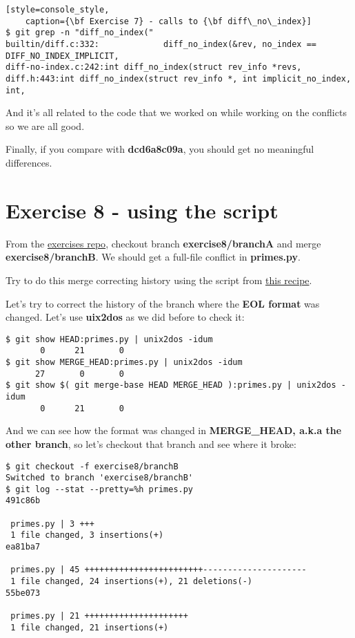 \begin{lstlisting}[style=console_style,
	caption={\bf Exercise 7} - calls to {\bf diff\_no\_index}]
$ git grep -n "diff_no_index("
builtin/diff.c:332:             diff_no_index(&rev, no_index == DIFF_NO_INDEX_IMPLICIT, 
diff-no-index.c:242:int diff_no_index(struct rev_info *revs,
diff.h:443:int diff_no_index(struct rev_info *, int implicit_no_index, int,
\end{lstlisting}

And it's all related to the code that we worked on while working on the conflicts so we are all good.

Finally, if you compare with {\bf dcd6a8c09a}, you should get no meaningful differences.

\section{Exercise 8 - using the script}
\label{exercise08}

From the \hyperref[exercises_repo]{exercises repo}, checkout branch {\bf exercise8/branchA} and merge {\bf exercise8/branchB}. We
should get a full-file conflict in {\bf primes.py}.

Try to do this merge correcting history using the script from \hyperref[correct_eol_history]{this recipe}.

Let's try to correct the history of the branch where the {\bf EOL format} was changed. Let's use {\bf uix2dos} as we did before to check it:

\begin{lstlisting}[style=console_style,
	basicstyle=\small,
	caption={\bf exercise 8} - EOL formats]
$ git show HEAD:primes.py | unix2dos -idum
       0      21       0
$ git show MERGE_HEAD:primes.py | unix2dos -idum
      27       0       0
$ git show $( git merge-base HEAD MERGE_HEAD ):primes.py | unix2dos -idum
       0      21       0
\end{lstlisting}

And we can see how the format was changed in {\bf MERGE\_HEAD, a.k.a the other branch}, so let's checkout that branch and see where it broke:

\begin{lstlisting}[style=console_style,
	basicstyle=\small,
	caption={\bf exercise 8} - Find out where it broke]
$ git checkout -f exercise8/branchB
Switched to branch 'exercise8/branchB'
$ git log --stat --pretty=%h primes.py
491c86b

 primes.py | 3 +++
 1 file changed, 3 insertions(+)
ea81ba7

 primes.py | 45 ++++++++++++++++++++++++---------------------
 1 file changed, 24 insertions(+), 21 deletions(-)
55be073

 primes.py | 21 +++++++++++++++++++++
 1 file changed, 21 insertions(+)
\end{lstlisting}

